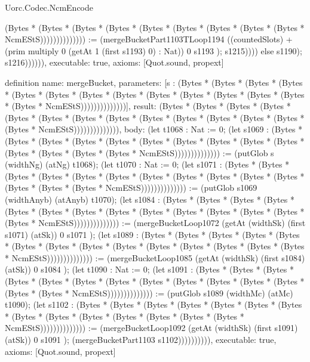 \begin{lexlean}{Uorc.Codec.NcmEncode}
\begin{semanticmodule}
{(Bytes * (Bytes * (Bytes * (Bytes * (Bytes * (Bytes * (Bytes * (Bytes * (Bytes * NcmEStS)))))))))))))) := (mergeBucketPart1103TLoop1194 ((countedSlots) + (prim multiply 0 (getAt 1 (first s1193) 0) : Nat)) 0 s1193 ); s1215)))) else s1190); s1216)))))),
  executable: true,
  axioms: [Quot.sound, propext]
}

definition{
  name: mergeBucket,
  parameters: [s : (Bytes * (Bytes * (Bytes * (Bytes * (Bytes * (Bytes * (Bytes * (Bytes * (Bytes * (Bytes * (Bytes * (Bytes * (Bytes * (Bytes * NcmEStS))))))))))))))],
  result: (Bytes * (Bytes * (Bytes * (Bytes * (Bytes * (Bytes * (Bytes * (Bytes * (Bytes * (Bytes * (Bytes * (Bytes * (Bytes * (Bytes * NcmEStS)))))))))))))),
  body: (let t1068 : Nat := 0; (let s1069 : (Bytes * (Bytes * (Bytes * (Bytes * (Bytes * (Bytes * (Bytes * (Bytes * (Bytes * (Bytes * (Bytes * (Bytes * (Bytes * (Bytes * NcmEStS)))))))))))))) := (putGlob s (widthNg) (atNg) t1068); (let t1070 : Nat := 0; (let s1071 : (Bytes * (Bytes * (Bytes * (Bytes * (Bytes * (Bytes * (Bytes * (Bytes * (Bytes * (Bytes * (Bytes * (Bytes * (Bytes * (Bytes * NcmEStS)))))))))))))) := (putGlob s1069 (widthAnyb) (atAnyb) t1070); (let s1084 : (Bytes * (Bytes * (Bytes * (Bytes * (Bytes * (Bytes * (Bytes * (Bytes * (Bytes * (Bytes * (Bytes * (Bytes * (Bytes * (Bytes * NcmEStS)))))))))))))) := (mergeBucketLoop1072 (getAt (widthSk) (first s1071) (atSk)) 0 s1071 ); (let s1089 : (Bytes * (Bytes * (Bytes * (Bytes * (Bytes * (Bytes * (Bytes * (Bytes * (Bytes * (Bytes * (Bytes * (Bytes * (Bytes * (Bytes * NcmEStS)))))))))))))) := (mergeBucketLoop1085 (getAt (widthSk) (first s1084) (atSk)) 0 s1084 ); (let t1090 : Nat := 0; (let s1091 : (Bytes * (Bytes * (Bytes * (Bytes * (Bytes * (Bytes * (Bytes * (Bytes * (Bytes * (Bytes * (Bytes * (Bytes * (Bytes * (Bytes * NcmEStS)))))))))))))) := (putGlob s1089 (widthMc) (atMc) t1090); (let s1102 : (Bytes * (Bytes * (Bytes * (Bytes * (Bytes * (Bytes * (Bytes * (Bytes * (Bytes * (Bytes * (Bytes * (Bytes * (Bytes * (Bytes * NcmEStS)))))))))))))) := (mergeBucketLoop1092 (getAt (widthSk) (first s1091) (atSk)) 0 s1091 ); (mergeBucketPart1103 s1102)))))))))),
  executable: true,
  axioms: [Quot.sound, propext]
}


\end{semanticmodule}
\end{lexlean}
